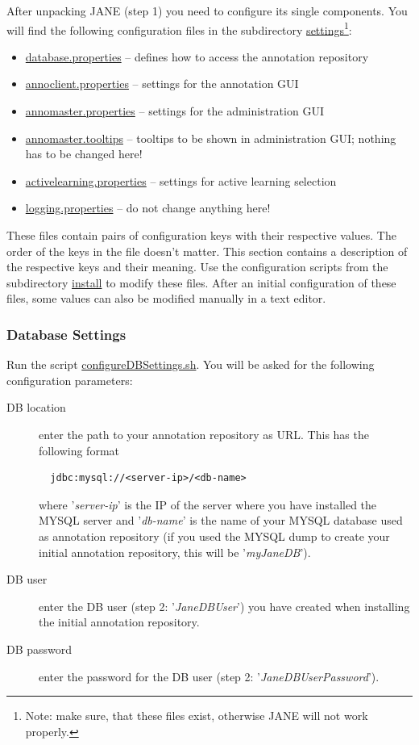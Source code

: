 \documentclass[DIV12,english,11pt,halfparskip]{scrartcl}
\begin{document}
After unpacking JANE (step 1) you need to configure its single
components. You will find the following configuration files in the
subdirectory \url{settings}\footnote{Note: make sure, that these files
  exist, otherwise JANE will not work properly.}:
\begin{itemize}
\item \url{database.properties} -- defines how to access the
  annotation repository
\item \url{annoclient.properties} -- settings for the annotation GUI
\item \url{annomaster.properties} -- settings for the administration
  GUI
\item \url{annomaster.tooltips} -- tooltips to be shown in
  administration GUI; nothing has to be changed here!
\item \url{activelearning.properties} -- settings for active learning selection
\item \url{logging.properties} -- do not change anything here!
\end{itemize}

These files contain pairs of configuration keys with their respective
values. The order of the keys in the file doesn't matter. This section
contains a description of the respective keys and their meaning. Use
the configuration scripts from the subdirectory \url{install} to
modify these files. After an initial configuration of these files,
some values can also be modified manually in a text editor.


\subsubsection{Database Settings}

Run the script \url{configureDBSettings.sh}. You will be asked for the
following configuration parameters:

\begin{description}
\item [DB location] enter the path to your annotation repository as
  URL. This has the following format 
\begin{verbatim}
  jdbc:mysql://<server-ip>/<db-name>
\end{verbatim}
  where '\emph{server-ip}' is the IP of the server where you have
  installed the MYSQL server and '\emph{db-name}' is the name of your
  MYSQL database used as annotation repository (if you used the MYSQL
  dump to create your initial annotation repository, this will be
  '\emph{myJaneDB}').
\item[DB user] enter the DB user (step 2: '\emph{JaneDBUser}') you
  have created when installing the initial annotation repository.
\item[DB password] enter the password for the DB user (step 2:
  '\emph{JaneDBUserPassword}').
\end{description}
\end{document}
